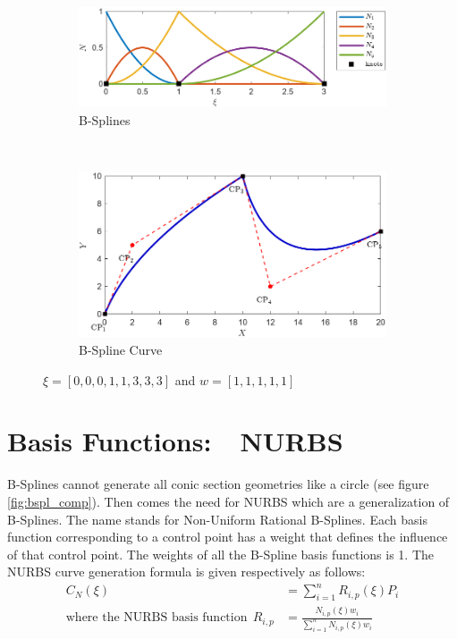 \documentclass[12pt, a4paper]{report}
\begin{document}
\begin{figure}[H]
\centering
\begin{subfigure}{0.8\textwidth}
  \centering
  \includegraphics[width=0.8\linewidth]{Images/NURBS_2.jpg}
  \caption{B-Splines }
\end{subfigure}\\[1ex] %
\begin{subfigure}{0.8\textwidth}
  \centering
  \includegraphics[width=0.8\linewidth]{Images/nCurve_2.png}
  \caption{B-Spline Curve}
\end{subfigure}
\caption{ $\xi=[0, 0, 0, 1, 1, 3, 3, 3]$ and $w=[1,1,1,1,1]$ }
\label{fig:curve2}
\end{figure}

\section{Basis Functions:~~NURBS}
\par
B-Splines cannot generate all conic section geometries like a circle (see figure \ref{fig:bspl_comp}). Then comes the need for NURBS which are a generalization of B-Splines. The name stands for Non-Uniform Rational B-Splines. Each basis function corresponding to a control point has a weight that defines the influence of that control point. The weights of all the B-Spline basis functions is 1.
The NURBS curve generation formula is given respectively as follows:
\begin{align}
C_N(\xi) &= \sum_{i=1}^{n} R_{i,p}(\xi)P_i\\
\text{where the NURBS basis function}~~ R_{i,p} &=  \frac{N_{i,p}(\xi)w_i}{\sum_{i=1}^{n} N_{i,p}(\xi)w_i}
\end{align}
\end{document}
